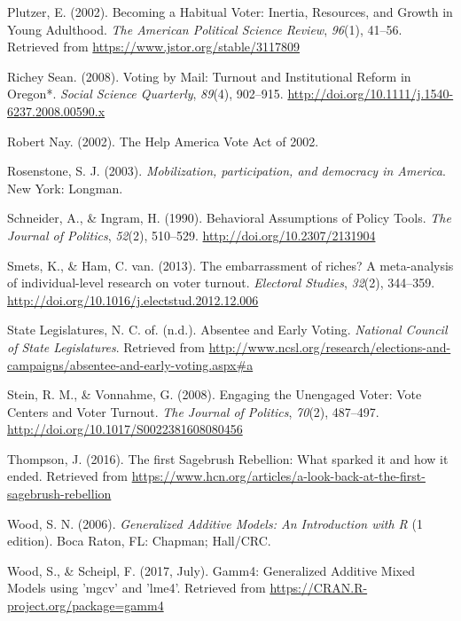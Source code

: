 \documentclass[12pt,twoside]{reedthesis}
\begin{document}
  \hypertarget{ref-plutzer_becoming_2002}{}
  Plutzer, E. (2002). Becoming a Habitual Voter: Inertia, Resources, and
  Growth in Young Adulthood. \emph{The American Political Science Review},
  \emph{96}(1), 41--56. Retrieved from
  \url{https://www.jstor.org/stable/3117809}
  
  \hypertarget{ref-richey_sean_voting_2008}{}
  Richey Sean. (2008). Voting by Mail: Turnout and Institutional Reform in
  Oregon*. \emph{Social Science Quarterly}, \emph{89}(4), 902--915.
  \url{http://doi.org/10.1111/j.1540-6237.2008.00590.x}
  
  \hypertarget{ref-robert_nay_help_2002}{}
  Robert Nay. (2002). The Help America Vote Act of 2002.
  
  \hypertarget{ref-rosenstone_mobilization_2003}{}
  Rosenstone, S. J. (2003). \emph{Mobilization, participation, and
  democracy in America}. New York: Longman.
  
  \hypertarget{ref-schneider_behavioral_1990}{}
  Schneider, A., \& Ingram, H. (1990). Behavioral Assumptions of Policy
  Tools. \emph{The Journal of Politics}, \emph{52}(2), 510--529.
  \url{http://doi.org/10.2307/2131904}
  
  \hypertarget{ref-smets_embarrassment_2013}{}
  Smets, K., \& Ham, C. van. (2013). The embarrassment of riches? A
  meta-analysis of individual-level research on voter turnout.
  \emph{Electoral Studies}, \emph{32}(2), 344--359.
  \url{http://doi.org/10.1016/j.electstud.2012.12.006}
  
  \hypertarget{ref-national_council_of_state_legislatures_absentee_nodate}{}
  State Legislatures, N. C. of. (n.d.). Absentee and Early Voting.
  \emph{National Council of State Legislatures}. Retrieved from
  \url{http://www.ncsl.org/research/elections-and-campaigns/absentee-and-early-voting.aspx\#a}
  
  \hypertarget{ref-stein_engaging_2008}{}
  Stein, R. M., \& Vonnahme, G. (2008). Engaging the Unengaged Voter: Vote
  Centers and Voter Turnout. \emph{The Journal of Politics}, \emph{70}(2),
  487--497. \url{http://doi.org/10.1017/S0022381608080456}
  
  \hypertarget{ref-thompson_first_2016}{}
  Thompson, J. (2016). The first Sagebrush Rebellion: What sparked it and
  how it ended. Retrieved from
  \url{https://www.hcn.org/articles/a-look-back-at-the-first-sagebrush-rebellion}
  
  \hypertarget{ref-wood_generalized_2006}{}
  Wood, S. N. (2006). \emph{Generalized Additive Models: An Introduction
  with R} (1 edition). Boca Raton, FL: Chapman; Hall/CRC.
  
  \hypertarget{ref-wood_gamm4:_2017}{}
  Wood, S., \& Scheipl, F. (2017, July). Gamm4: Generalized Additive Mixed
  Models using 'mgcv' and 'lme4'. Retrieved from
  \url{https://CRAN.R-project.org/package=gamm4}


\end{document}

